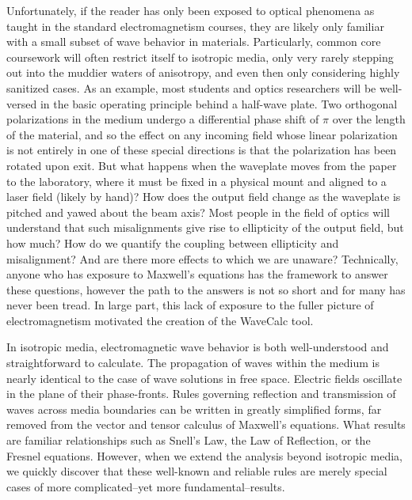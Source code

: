 \documentclass[11pt, reqno]{book}%
\newcounter{ct}
\begin{document}
Unfortunately, if the reader has only been exposed to optical phenomena as taught in the standard electromagnetism courses, they are likely only familiar with a small subset of wave behavior in materials. Particularly, common core coursework will often restrict itself to isotropic media, only very rarely stepping out into the muddier waters of anisotropy, and even then only considering highly sanitized cases. As an example, most students and optics researchers will be well-versed in the basic operating principle behind a half-wave plate. Two orthogonal polarizations in the medium undergo a differential phase shift of $\pi$ over the length of the material, and so the effect on any incoming field whose linear polarization is not entirely in one of these special directions is that the polarization has been rotated upon exit. But what happens when the waveplate moves from the paper to the laboratory, where it must be fixed in a physical mount and aligned to a laser field (likely by hand)? How does the output field change as the waveplate is pitched and yawed about the beam axis? Most people in the field of optics will understand that such misalignments give rise to ellipticity of the output field, but how much? How do we quantify the coupling between ellipticity and misalignment? And are there more effects to which we are unaware? Technically, anyone who has exposure to Maxwell's equations has the framework to answer these questions, however the path to the answers is not so short and for many has never been tread. In large part, this lack of exposure to the fuller picture of electromagnetism motivated the creation of the WaveCalc tool.

In isotropic media, electromagnetic wave behavior is both well-understood and straightforward to calculate. The propagation of waves within the medium is nearly identical to the case of wave solutions in free space. Electric fields oscillate in the plane of their phase-fronts. Rules governing reflection and transmission of waves across media boundaries can be written in greatly simplified forms, far removed from the vector and tensor calculus of Maxwell's equations. What results are familiar relationships such as Snell's Law, the Law of Reflection, or the Fresnel equations. However, when we extend the analysis beyond isotropic media, we quickly discover that these well-known and reliable rules are merely special cases of more complicated--yet more fundamental--results.
\end{document}
